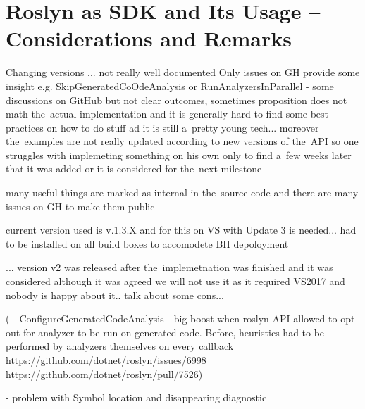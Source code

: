 \documentclass[
  digital, %
  table,   %
  lof,     %
  lot,     %
  oneside,
]{fithesis3}
\begin{document}
\section{Roslyn as SDK and Its Usage -- Considerations and Remarks}
Changing versions ... not really well documented
Only issues on GH provide some insight
e.g. SkipGeneratedCoOdeAnalysis or RunAnalyzersInParallel - some discussions on GitHub but not clear outcomes, sometimes proposition does not math the~actual implementation and it is generally hard to find some best practices on how to do stuff ad it is still a~pretty young tech... moreover the~examples are not really updated according to new versions of the~API so one struggles with implemeting something on his own only to find a~few weeks later that it was added or it is considered for the~next milestone

many useful things are marked as internal in the~source code and there are many issues on GH to make them public

current version used is v.1.3.X and for this on VS with Update 3 is needed... had to be installed on all build boxes to accomodete BH depoloyment

... version v2 was released after the~implemetnation was finished and it was considered although it was agreed we will not use it as it required VS2017 and nobody is happy about it.. talk about some cons...

(  - ConfigureGeneratedCodeAnalysis - big boost when roslyn API allowed to opt out for analyzer to be run on generated code. Before, heuristics had to be performed by analyzers themselves on every callback
   https://github.com/dotnet/roslyn/issues/6998
   https://github.com/dotnet/roslyn/pull/7526)

- problem with Symbol location and disappearing diagnostic 

	\makeatletter\thesis@blocks@clear\makeatother

	\printindex
    
  \printbibliography
\end{document}
